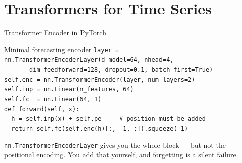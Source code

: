 \documentclass[aspectratio=169, 11pt]{beamer}
\begin{document}
\section{Transformers for Time Series}


\begin{frame}{Transformer Encoder in PyTorch}
  \begin{examplebox}{Minimal forecasting encoder}
    {\tiny\linespread{1.15}\selectfont
    \texttt{layer = nn.TransformerEncoderLayer(d\_model=64, nhead=4,}\\
    \texttt{\mbox{}\ \ \ \ \ \ \ dim\_feedforward=128, dropout=0.1, batch\_first=True)}\\
    \texttt{self.enc = nn.TransformerEncoder(layer, num\_layers=2)}\\
    \texttt{self.inp = nn.Linear(n\_features, 64)}\\
    \texttt{self.fc\ \ = nn.Linear(64, 1)}\\[3pt]
    \texttt{def forward(self, x):}\\
    \texttt{\mbox{}\ \ h = self.inp(x) + self.pe\ \ \ \ \ \# position must be added}\\
    \texttt{\mbox{}\ \ return self.fc(self.enc(h)[:, -1, :]).squeeze(-1)}
    }
  \end{examplebox}
  \texttt{nn.TransformerEncoderLayer} gives you the whole block --- but not the positional
  encoding. You add that yourself, and forgetting is a silent failure.

\end{frame}
\end{document}
